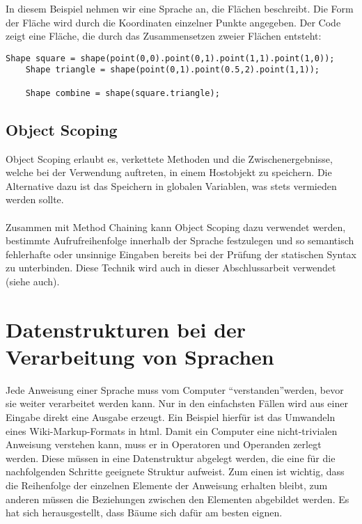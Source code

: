 In diesem Beispiel nehmen wir eine Sprache an, die Flächen beschreibt. Die Form der Fläche wird durch die Koordinaten einzelner Punkte angegeben. Der Code zeigt eine Fläche, die durch das Zusammensetzen zweier Flächen entsteht:

\begin{lstlisting}[caption=beispielhafte Verwendung von Method Nesting]
	Shape square = shape(point(0,0).point(0,1).point(1,1).point(1,0));
	Shape triangle = shape(point(0,1).point(0.5,2).point(1,1));
	
	Shape combine = shape(square.triangle);
\end{lstlisting}

\subsection{Object Scoping}\label{ssct:4.1.3:scoping}
Object Scoping erlaubt es, verkettete Methoden und die Zwischenergebnisse, welche bei der Verwendung auftreten, in einem Hostobjekt zu speichern. Die Alternative dazu ist das Speichern in globalen Variablen, was stets vermieden werden sollte.
\\ \\
Zusammen mit Method Chaining kann Object Scoping dazu verwendet werden, bestimmte Aufrufreihenfolge innerhalb der Sprache festzulegen und so semantisch fehlerhafte oder unsinnige Eingaben bereits bei der Prüfung der statischen Syntax zu unterbinden. Diese Technik wird auch in dieser Abschlussarbeit verwendet (siehe auch).

\section{Datenstrukturen bei der Verarbeitung von Sprachen}\label{sct:4.2:datenstrukturen}
Jede Anweisung einer Sprache muss vom Computer \textquotedblleft verstanden\textquotedblright werden, bevor sie weiter verarbeitet werden kann. Nur in den einfachsten Fällen wird aus einer Eingabe direkt eine Ausgabe erzeugt. Ein Beispiel hierfür ist das Umwandeln eines Wiki-Markup-Formats in html\cite{book:parrLang}.
Damit ein Computer eine nicht-trivialen Anweisung verstehen kann, muss er in Operatoren und Operanden zerlegt werden. Diese müssen in eine Datenstruktur abgelegt werden, die eine für die nachfolgenden Schritte geeignete Struktur aufweist. Zum einen ist wichtig, dass die Reihenfolge der einzelnen Elemente der Anweisung erhalten bleibt, zum anderen müssen die Beziehungen zwischen den Elementen abgebildet werden. Es hat sich herausgestellt, dass Bäume sich dafür am besten eignen\cite{book:parrLang}.

